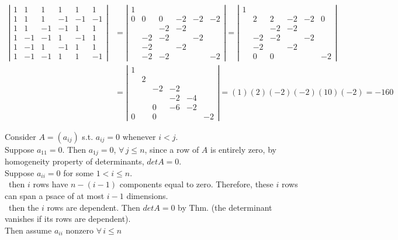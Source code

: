 \documentclass[twoside]{amsart}
\theoremstyle{plain}
\theoremstyle{definition}
\newcommand{\exercisehead}[1]
  {
   \noindent{\small\bf Exercise #1.}
   \smallskip}
\begin{document}
\begin{enumerate}
\[\begin{aligned}
    \left| \begin{matrix} 1 & 1 & 1 & 1 & 1 & 1 \\ 1 & 1 & 1 & -1 & -1 & -1 \\ 1 & 1 & -1 & -1 & 1 & 1 \\ 1 & -1 & -1 & 1 & -1 & 1 \\ 1 & -1 & 1 & -1 & 1 & 1 \\ 1 & -1 & -1 & 1 & 1 & -1 \end{matrix} \right|  & = \left| \begin{matrix} 1 & & & & & \\ 0 & 0 & 0 & -2 & -2 & -2 \\ & & -2 & -2 & & \\ & -2 & -2 & & -2 & \\ & -2 & & -2 & & \\ & -2 & -2 & & & -2 \end{matrix} \right| = \left| \begin{matrix} 1 & & & & & \\ & 2 & 2 & -2 & -2 & 0 \\ & & -2 & -2 & & \\ & -2 & -2 & & -2 &  \\ & -2 & & -2 & & \\ & 0 & 0 & & & -2 \end{matrix} \right|  \\
    & = \left| \begin{matrix} 1 & & & & & \\ & 2 & & & & \\ & & -2 & -2 & & \\ & & & -2 & -4 &  \\ & & 0 & -6 & -2 & \\ 0 & & 0 &  & & -2 \end{matrix} \right| = (1)(2)(-2)(-2)(10)(-2) = -160
  \end{aligned}
  \] 
\end{enumerate}

\exercisehead{5}  Consider $A = (a_{ij})$ s.t. $a_{ij} = 0$ whenever $i<j$.   \\
Suppose $a_{11} = 0$.  Then $a_{1j} = 0$, $\forall \, j \leq n$, since a row of $A$ is entirely zero, by homogeneity property of determinants, $det{A} =0$.   \\
Suppose $a_{ii} =0$ for some $1 < i \leq n$.  \\
\quad \, then $i$ rows have $n-(i-1)$ components equal to zero.  Therefore, these $i$ rows can span a psace of at most $i-1$ dimensions.  \\
\quad \quad \, then the $i$ rows are dependent.  Then $det{A} =0 $ by Thm. (the determinant vanishes if its rows are dependent).   \\
\quad Then assume $a_{ii}$ nonzero $\forall \, i \leq n$ \\
\end{document}

